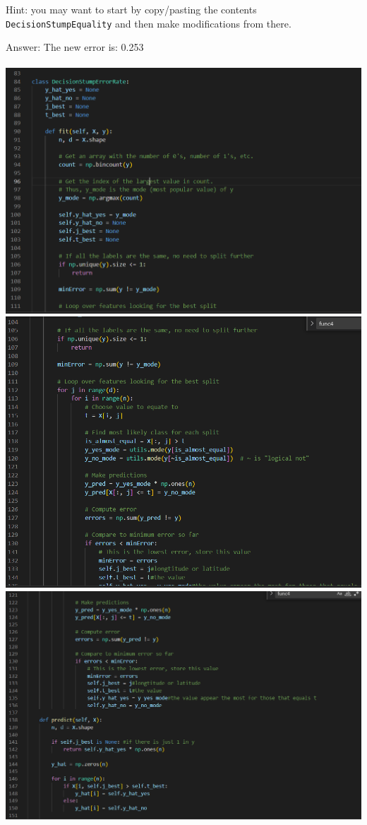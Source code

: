 \documentclass{article}
\def\ans#1{\par\gre{Answer: #1}}
\def\gre#1{{\color{gre}#1}}
\begin{document}
  Hint: you may want to start by copy/pasting the contents \texttt{DecisionStumpEquality} and then make modifications from there.
  \ans{The new error is: 0.253}\\\\
  \includegraphics{6_2_1}
  \includegraphics{6_2_2}
  \includegraphics{6_2_3}
\end{document}
